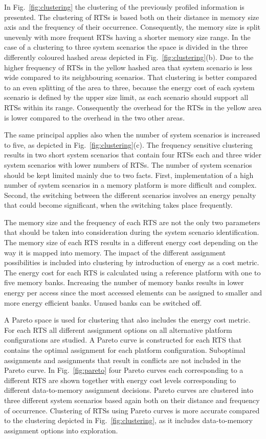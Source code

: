 \documentclass{acm_proc_article-sp}
\begin{document}
In Fig.~\ref{fig:clustering} the clustering of the previously profiled information is presented. The clustering of RTSs is based both on their distance in memory size axis and the frequency of their occurrence. Consequently, the memory size is split unevenly with more frequent RTSs having a shorter memory size range. In the case of a clustering to three system scenarios the space is divided in the three differently coloured hashed areas depicted in Fig.~\ref{fig:clustering}(b). Due to the higher frequency of RTSs in the yellow hashed area that system scenario is less wide compared to its neighbouring scenarios. That clustering is better compared to an even splitting of the area to three, because the energy cost of each system scenario is defined by the upper size limit, as each scenario should support all RTSs within its range. Consequently the overhead for the RTSs in the yellow area is lower compared to the overhead in the two other areas.

The same principal applies also when the number of system scenarios is increased to five, as depicted in Fig.~\ref{fig:clustering}(c). The frequency sensitive clustering results in two short system scenarios that contain four RTSs each and three wider system scenarios with lower numbers of RTSs. The number of system scenarios should be kept limited mainly due to two facts. First, implementation of a high number of system scenarios in a memory platform is more difficult and complex. Second, the switching between the different scenarios involves an energy penalty that could become significant, when the switching takes place frequently.

The memory size and the frequency of each RTS are not the only two parameters that should be taken into consideration during the system scenario identification. The memory size of each RTS results in a different energy cost depending on the way it is mapped into memory. The impact of the different assignment possibilities is included into clustering by introduction of energy as a cost metric. The energy cost for each RTS is calculated using a reference platform with one to five memory banks. Increasing the number of memory banks results in lower energy per access since the most accessed elements can be assigned to smaller and more energy efficient banks. Unused banks can be switched off.

A Pareto space is used for clustering that also includes the energy cost metric. For each RTS all different assignment options on all alternative platform configurations are studied. A Pareto curve is constructed for each RTS that contains the optimal assignment for each platform configuration. Suboptimal assignments and assignments that result in conflicts are not included in the Pareto curve. In Fig.~\ref{fig:pareto} four Pareto curves each corresponding to a different RTS are shown together with energy cost levels corresponding to different data-to-memory assignment decisions. Pareto curves are clustered into three different system scenarios based again both on their distance and frequency of occurrence. Clustering of RTSs using Pareto curves is more accurate compared to the clustering depicted in Fig.~\ref{fig:clustering}, as it includes   data-to-memory assignment options into exploration. 
\end{document}
